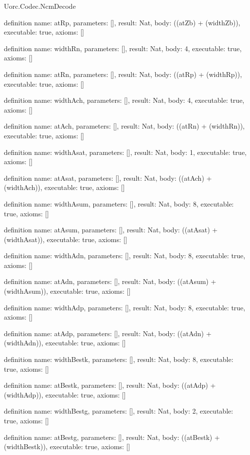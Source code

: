 \begin{lexlean}{Uorc.Codec.NcmDecode}
\begin{semanticmodule}
definition{
  name: atRp,
  parameters: [],
  result: Nat,
  body: ((atZb) + (widthZb)),
  executable: true,
  axioms: []
}

definition{
  name: widthRn,
  parameters: [],
  result: Nat,
  body: 4,
  executable: true,
  axioms: []
}

definition{
  name: atRn,
  parameters: [],
  result: Nat,
  body: ((atRp) + (widthRp)),
  executable: true,
  axioms: []
}

definition{
  name: widthAch,
  parameters: [],
  result: Nat,
  body: 4,
  executable: true,
  axioms: []
}

definition{
  name: atAch,
  parameters: [],
  result: Nat,
  body: ((atRn) + (widthRn)),
  executable: true,
  axioms: []
}

definition{
  name: widthAsat,
  parameters: [],
  result: Nat,
  body: 1,
  executable: true,
  axioms: []
}

definition{
  name: atAsat,
  parameters: [],
  result: Nat,
  body: ((atAch) + (widthAch)),
  executable: true,
  axioms: []
}

definition{
  name: widthAsum,
  parameters: [],
  result: Nat,
  body: 8,
  executable: true,
  axioms: []
}

definition{
  name: atAsum,
  parameters: [],
  result: Nat,
  body: ((atAsat) + (widthAsat)),
  executable: true,
  axioms: []
}

definition{
  name: widthAdn,
  parameters: [],
  result: Nat,
  body: 8,
  executable: true,
  axioms: []
}

definition{
  name: atAdn,
  parameters: [],
  result: Nat,
  body: ((atAsum) + (widthAsum)),
  executable: true,
  axioms: []
}

definition{
  name: widthAdp,
  parameters: [],
  result: Nat,
  body: 8,
  executable: true,
  axioms: []
}

definition{
  name: atAdp,
  parameters: [],
  result: Nat,
  body: ((atAdn) + (widthAdn)),
  executable: true,
  axioms: []
}

definition{
  name: widthBestk,
  parameters: [],
  result: Nat,
  body: 8,
  executable: true,
  axioms: []
}

definition{
  name: atBestk,
  parameters: [],
  result: Nat,
  body: ((atAdp) + (widthAdp)),
  executable: true,
  axioms: []
}

definition{
  name: widthBestg,
  parameters: [],
  result: Nat,
  body: 2,
  executable: true,
  axioms: []
}

definition{
  name: atBestg,
  parameters: [],
  result: Nat,
  body: ((atBestk) + (widthBestk)),
  executable: true,
  axioms: []
}


\end{semanticmodule}
\end{lexlean}
